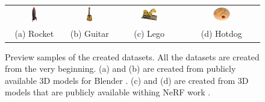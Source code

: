 \begingroup
\setlength{\tabcolsep}{15pt} %
\begin{figure}[!htb]
    \centering
    \begin{tabular}{cccc}
        \includegraphics[width=0.1\textwidth]{figures/rocket.png}
        & \includegraphics[width=0.13\textwidth]{figures/guitar.png}
        & \includegraphics[width=0.30\textwidth]{figures/lego.png}
        & \includegraphics[width=0.25\textwidth]{figures/hotdog.png} \\
        (a) Rocket & (b) Guitar & (c) Lego & (d) Hotdog
    \end{tabular}
    \caption{
    Preview samples of the created datasets.
    All the datasets are created from the very beginning.
    (a) \cite{boucher2019rocket} and (b) \cite{legalov2020guitar} are created from publicly available 3D models for Blender \cite{blender}.
    (c) and (d) are created from 3D models that are publicly available withing NeRF work \cite{mildenhall2019local}.
}
\label{fig:dataset_preview}
\end{figure}
\endgroup